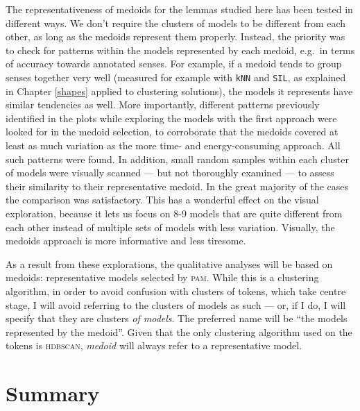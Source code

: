 \documentclass[
]{book}
\begin{document}
The representativeness of medoids for the lemmas studied here has been tested in different ways.
We don't require the clusters of models to be different from each other, as long as the medoids represent them properly. Instead, the priority was to check for patterns within the models represented by each medoid, e.g.~in terms of accuracy towards annotated senses. For example, if a medoid tends to group senses together very well (measured for example with \texttt{kNN} and \texttt{SIL}, as explained in Chapter \ref{shapes} applied to clustering solutions), the models it represents have similar tendencies as well.
More importantly, different patterns previously identified in the plots while exploring the models with the first approach were looked for in the medoid selection, to corroborate that the medoids covered at least as much variation as the more time- and energy-consuming approach. All such patterns were found. In addition, small random samples within each cluster of models were visually scanned --- but not thoroughly examined --- to assess their similarity to their representative medoid. In the great majority of the cases the comparison was satisfactory. This has a wonderful effect on the visual exploration, because it lets us focus on 8-9 models that are quite different from each other instead of multiple sets of models with less variation. Visually, the medoids approach is more informative and less tiresome.

As a result from these explorations, the qualitative analyses will be based on medoids: representative models selected by \textsc{pam}. While this is a clustering algorithm, in order to avoid confusion with clusters of tokens, which take centre stage, I will avoid referring to the clusters of models as such --- or, if I do, I will specify that they are clusters \emph{of models}. The preferred name will be ``the models represented by the medoid''. Given that the only clustering algorithm used on the tokens is \textsc{hdbscan}, \emph{medoid} will always refer to a representative model.

\hypertarget{workflow-summary}{%
\section{Summary}\label{workflow-summary}}
\end{document}
